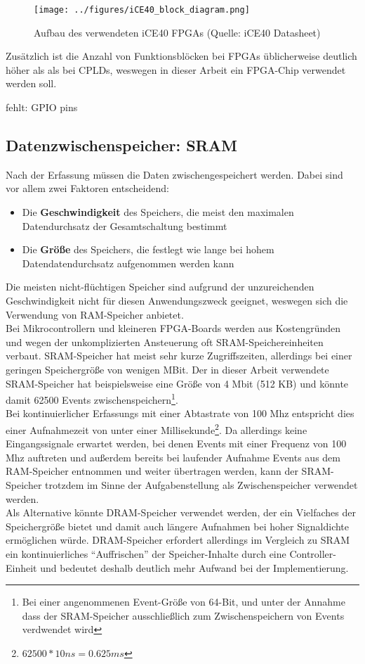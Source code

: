 \begin{figure}[htbp]
	\centering
		\texttt{[image: ../figures/iCE40\_block\_diagram.png]}
	\caption[Blockdiagramm des verwendeten iCE40 FPGAs]{Aufbau des verwendeten iCE40 FPGAs (Quelle: iCE40 Datasheet{\cite{doc:datasheet}})}
	\label{fig:ice40_block_diagram}
\end{figure}

Zusätzlich ist die Anzahl von Funktionsblöcken bei FPGAs üblicherweise deutlich höher als als bei CPLDs, weswegen in dieser Arbeit ein FPGA-Chip verwendet werden soll.

fehlt: GPIO pins

\subsection{Datenzwischenspeicher: SRAM}

Nach der Erfassung müssen die Daten zwischengespeichert werden. Dabei sind vor allem zwei Faktoren entscheidend:
\begin{itemize} 
	\item Die \textbf{Geschwindigkeit} des Speichers, die meist den maximalen Datendurchsatz der Gesamtschaltung bestimmt
	\item Die \textbf{Größe} des Speichers, die festlegt wie lange bei hohem Datendatendurchsatz aufgenommen werden kann 
\end{itemize}
Die meisten nicht-flüchtigen Speicher sind aufgrund der unzureichenden Geschwindigkeit nicht für diesen Anwendungszweck geeignet, weswegen sich die Verwendung von \acrshort{RAM}-Speicher anbietet. \\
Bei Mikrocontrollern und kleineren FPGA-Boards werden aus Kostengründen und wegen der unkomplizierten Ansteuerung oft SRAM-Speichereinheiten verbaut. SRAM-Speicher hat meist sehr kurze Zugriffszeiten, allerdings bei einer geringen Speichergröße von wenigen MBit. Der in dieser Arbeit verwendete SRAM-Speicher hat beispielsweise eine Größe von 4 Mbit (512 KB) und könnte damit 62500 Events zwischenspeichern\footnote{Bei einer angenommenen Event-Größe von 64-Bit, und unter der Annahme dass der SRAM-Speicher ausschließlich zum Zwischenspeichern von Events verdwendet wird}.\\
Bei kontinuierlicher Erfassungs mit einer Abtastrate von 100 Mhz entspricht dies einer Aufnahmezeit von unter einer Millisekunde\footnote{$62500 * 10 ns = 0.625 ms$}. Da allerdings keine Eingangssignale erwartet werden, bei denen Events mit einer Frequenz von 100 Mhz auftreten und außerdem bereits bei laufender Aufnahme Events aus dem RAM-Speicher entnommen und weiter übertragen werden, kann der SRAM-Speicher trotzdem im Sinne der Aufgabenstellung als Zwischenspeicher verwendet werden.\\
Als Alternative könnte DRAM-Speicher verwendet werden, der ein Vielfaches der Speichergröße bietet und damit auch längere Aufnahmen bei hoher Signaldichte ermöglichen würde. DRAM-Speicher erfordert allerdings im Vergleich zu SRAM ein kontinuierliches ``Auffrischen'' der Speicher-Inhalte durch eine Controller-Einheit und bedeutet deshalb deutlich mehr Aufwand bei der Implementierung.



